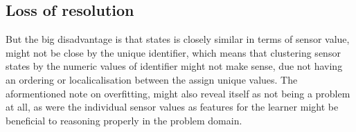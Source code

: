 \subsection{Loss of resolution}

But the big disadvantage is that states is closely similar in terms of sensor value, might not be close by the unique identifier, which means that clustering sensor states by the numeric values of identifier might not make sense, due not having an ordering or localicalisation between the assign unique values.
The aformentioned note on overfitting, might also reveal itself as not being a problem at all, as were the individual sensor values as features for the learner might be beneficial to reasoning properly in the problem domain.
